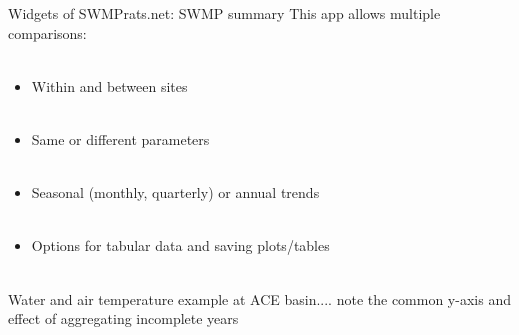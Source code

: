 \documentclass[xcolor=dvipsnames,serif]{beamer}\usepackage[]{graphicx}\usepackage[]{color}
\newcommand{\Bigtxt}[1]{\textbf{\textit{#1}}}
\begin{document}
\begin{frame}{Widgets of SWMPrats.net: SWMP summary}
This app allows multiple comparisons: \\~\\
\begin{itemize}
\item Within and between sites \\~\\
\item Same or different parameters \\~\\
\item Seasonal (monthly, quarterly) or annual trends \\~\\
\item Options for tabular data and saving plots/tables \\~\\
\end{itemize}
Water and air temperature example at ACE basin.... note the common y-axis and effect of aggregating incomplete years
\end{frame}

\end{document}
